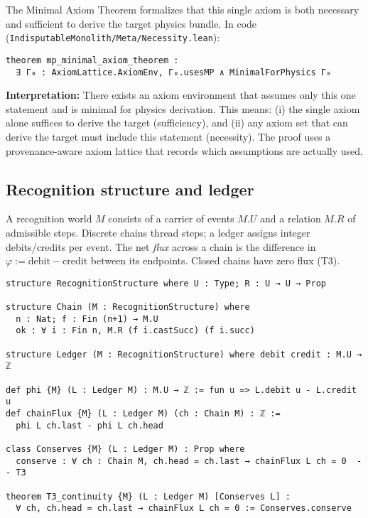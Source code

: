 \documentclass[11pt,a4paper,twoside]{article}
\numberwithin{equation}{section}
\renewcommand{\phi}{\varphi}
\theoremstyle{customthm}
\theoremstyle{customdef}
\theoremstyle{customrem}
\begin{document}
The Minimal Axiom Theorem formalizes that this single axiom is both necessary and sufficient to derive the target physics bundle. In code (\texttt{IndisputableMonolith/Meta/Necessity.lean}):

\begin{lstlisting}
theorem mp_minimal_axiom_theorem :
  ∃ Γ₀ : AxiomLattice.AxiomEnv, Γ₀.usesMP ∧ MinimalForPhysics Γ₀
\end{lstlisting}

\noindent\textbf{Interpretation:} There exists an axiom environment that assumes only this one statement and is minimal for physics derivation. This means: (i) the single axiom alone suffices to derive the target (sufficiency), and (ii) any axiom set that can derive the target must include this statement (necessity). The proof uses a provenance-aware axiom lattice that records which assumptions are actually used.

\subsection{Recognition structure and ledger}

A recognition world $M$ consists of a carrier of events $M.U$ and a relation $M.R$ of admissible steps. Discrete chains thread steps; a ledger assigns integer debits/credits per event. The net \emph{flux} across a chain is the difference in $\phi:=\mathrm{debit}-\mathrm{credit}$ between its endpoints. Closed chains have zero flux (T3).

\begin{lstlisting}
structure RecognitionStructure where U : Type; R : U → U → Prop

structure Chain (M : RecognitionStructure) where
  n : Nat; f : Fin (n+1) → M.U
  ok : ∀ i : Fin n, M.R (f i.castSucc) (f i.succ)

structure Ledger (M : RecognitionStructure) where debit credit : M.U → ℤ

def phi {M} (L : Ledger M) : M.U → ℤ := fun u => L.debit u - L.credit u
def chainFlux {M} (L : Ledger M) (ch : Chain M) : ℤ :=
  phi L ch.last - phi L ch.head

class Conserves {M} (L : Ledger M) : Prop where
  conserve : ∀ ch : Chain M, ch.head = ch.last → chainFlux L ch = 0  -- T3

theorem T3_continuity {M} (L : Ledger M) [Conserves L] :
  ∀ ch, ch.head = ch.last → chainFlux L ch = 0 := Conserves.conserve
\end{lstlisting}
\end{document}
